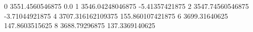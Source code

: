 0 3551.4560546875 0.0
1 3546.04248046875 -5.41357421875
2 3547.74560546875 -3.71044921875
4 3707.316162109375 155.860107421875
6 3699.31640625 147.8603515625
8 3688.79296875 137.3369140625
